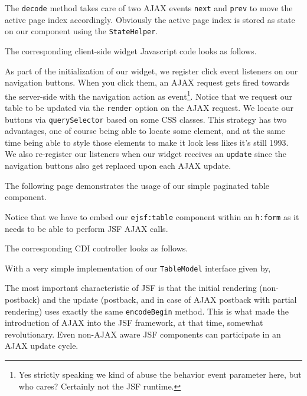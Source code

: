 The \texttt{decode} method takes care of two AJAX events \texttt{next} and \texttt{prev} to move the active page index accordingly.
Obviously the active page index is stored as state on our component using the \texttt{StateHelper}.

The corresponding client-side widget Javascript code looks as follows.

As part of the initialization of our widget, we register click event listeners on our navigation buttons.
When you click them, an AJAX request gets fired towards the server-side with the navigation action as event\footnote{Yes strictly speaking we kind of abuse the behavior event parameter here, but who cares? Certainly not the JSF runtime.}.
Notice that we request our table to be updated via the \texttt{render} option on the AJAX request.
We locate our buttons via \texttt{querySelector} based on some CSS classes.
This strategy has two advantages, one of course being able to locate some element, and at the same time being able to style those elements to make it look less likes it's still 1993.
We also re-register our listeners when our widget receives an \texttt{update} since the navigation buttons also get replaced upon each AJAX update.

The following page demonstrates the usage of our simple paginated table component.

Notice that we have to embed our \texttt{ejsf:table} component within an \texttt{h:form} as it needs to be able to perform JSF AJAX calls.

The corresponding CDI controller looks as follows.


With a very simple implementation of our \texttt{TableModel} interface given by,


The most important characteristic of JSF is that the initial rendering (non-postback) and the update (postback, and in case of AJAX postback with partial rendering) uses exactly the same \texttt{encodeBegin} method.
This is what made the introduction of AJAX into the JSF framework, at that time, somewhat revolutionary.
Even non-AJAX aware JSF components can participate in an AJAX update cycle.

